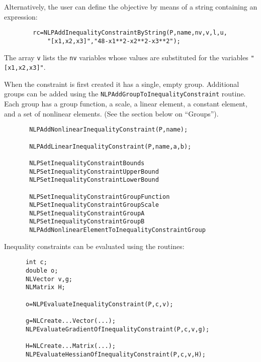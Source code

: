 \documentclass[12pt]{article}
\begin{document}
     Alternatively, the user can define the objective by means of a string containing an expression:
     \begin{verbatim}
        rc=NLPAddInequalityConstraintByString(P,name,nv,v,l,u,
            "[x1,x2,x3]","48-x1**2-x2**2-x3**2");
     \end{verbatim}
     The array {\tt v} lists the {\tt nv} variables whose values are substituted for the variables
     {\tt "[x1,x2,x3]"}.

     When the constraint is first created it has a single, empty group. Additional groups can be added using the
     {\tt NLPAdd\-Group\-To\-Inequality\-Constraint} routine. Each group has a group function, a scale, a linear element,
     a constant element, and a set of nonlinear elements. (See the section below on ``Groups'').
     \begin{verbatim}
       NLPAddNonlinearInequalityConstraint(P,name);

       NLPAddLinearInequalityConstraint(P,name,a,b);

       NLPSetInequalityConstraintBounds
       NLPSetInequalityConstraintUpperBound
       NLPSetInequalityConstraintLowerBound

       NLPSetInequalityConstraintGroupFunction
       NLPSetInequalityConstraintGroupScale
       NLPSetInequalityConstraintGroupA
       NLPSetInequalityConstraintGroupB
       NLPAddNonlinearElementToInequalityConstraintGroup
     \end{verbatim}

     Inequality constraints can be evaluated using the routines:
     \begin{verbatim}
      int c;
      double o;
      NLVector v,g;
      NLMatrix H;

      o=NLPEvaluateInequalityConstraint(P,c,v);

      g=NLCreate...Vector(...);
      NLPEvaluateGradientOfInequalityConstraint(P,c,v,g);

      H=NLCreate...Matrix(...);
      NLPEvaluateHessianOfInequalityConstraint(P,c,v,H);
     \end{verbatim}
\end{document}
